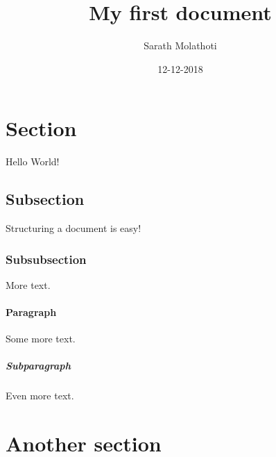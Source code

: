 \documentclass{article}
\title{My first document}
\date{12-12-2018}
\author{Sarath Molathoti}
\begin{document}
  \maketitle
  \newpage
\section{Section}
Hello World!

\subsection{Subsection}
Structuring a document is easy!

\subsubsection{Subsubsection}
More text.

\paragraph{Paragraph}
Some more text.

\subparagraph{Subparagraph}
Even more text.

\section{Another section}
\end{document}
